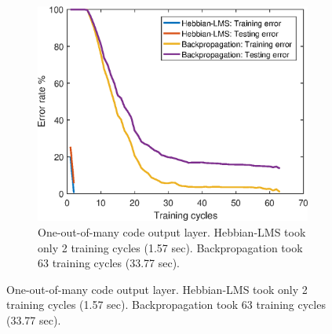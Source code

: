 \documentclass[a4paper]{article}
\begin{document}
\FloatBarrier
\begin{figure}[h!]
	\centering
	\begin{subfigure}[h!]{0.8\textwidth}
		\includegraphics[width=\textwidth]{learning_curve_oom_code.eps}
		\caption{One-out-of-many code output layer. Hebbian-LMS took only 2 training cycles (1.57 sec). Backpropagation took 63 training cycles (33.77 sec).}
		\label{fig:learning_curve_oom_code}
	\end{subfigure}%


\end{figure}
\end{document}
